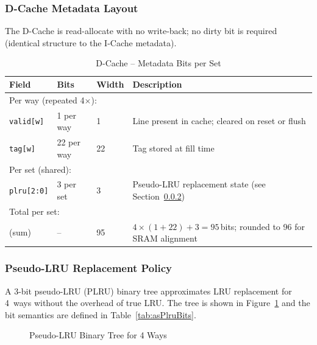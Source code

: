 \subsubsection{D-Cache Metadata Layout}

The D-Cache is read-allocate with no write-back; no dirty bit is required
(identical structure to the I-Cache metadata).

\begin{table}[H]
\caption{D-Cache -- Metadata Bits per Set}
\label{tab:asDCacheTag}
\centering
\begin{tabularx}{\textwidth}{|l |l |l |X|}
  \hline
  Field & Bits & Width & Description \\
  \hline
  \hline
  \multicolumn{4}{|l|}{Per way (repeated 4$\times$):} \\
  \hline
  \texttt{valid[w]}  & 1 per way  & 1  & Line present in cache; cleared on reset or flush \\
  \hline
  \texttt{tag[w]}    & 22 per way & 22 & Tag stored at fill time \\
  \hline
  \multicolumn{4}{|l|}{Per set (shared):} \\
  \hline
  \texttt{plru[2:0]} & 3 per set  & 3  & Pseudo-LRU replacement state (see Section~\ref{subsec:plru}) \\
  \hline
  \multicolumn{4}{|l|}{Total per set:} \\
  \hline
  (sum) & -- & 95 & $4 \times (1+22) + 3 = 95$\,bits; rounded to 96 for SRAM alignment \\
  \hline
\end{tabularx}
\end{table}

\subsubsection{Pseudo-LRU Replacement Policy}
\label{subsec:plru}

A 3-bit pseudo-LRU (PLRU) binary tree approximates LRU replacement for
4~ways without the overhead of true LRU.
The tree is shown in Figure~\ref{fig:asPlru} and the bit semantics are
defined in Table~\ref{tab:asPlruBits}.

\begin{figure}[H]
\centering
{}
\caption{Pseudo-LRU Binary Tree for 4 Ways}
\label{fig:asPlru}
\end{figure}

